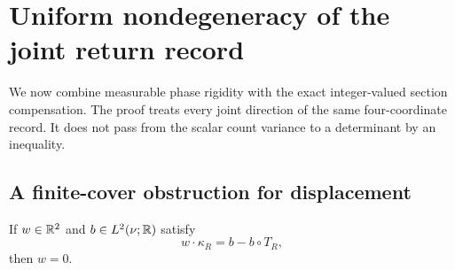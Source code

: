 \section{Uniform nondegeneracy of the joint return record}
\label{sec:joint-nondegeneracy}
We now combine measurable phase rigidity with the exact integer-valued
section compensation. The proof treats every joint direction of the
same four-coordinate record. It does not pass from the scalar count
variance to a determinant by an inequality.

\subsection{A finite-cover obstruction for displacement}
\begin{lemma}
\label{lem:no-spatial-coboundary}
If $w\in\mathbb R^2$ and $b\in L^2(\nu;\mathbb R)$ satisfy
\begin{equation}\label{eq:spatial-coboundary}
 w\cdot\kappa_R=b-b\circ T_R,
\end{equation}
then $w=0$.
\end{lemma}
